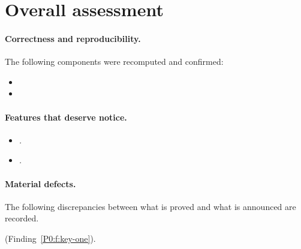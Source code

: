 \documentclass[11pt]{article}
\newcommand{\pk}{P0}
\newif\ifdraftnotes     \draftnotesfalse    %
\theoremstyle{definition}
\newcommand{\fref}[1]{Finding~\ref{\pk:f:#1}}      %
\newcommand{\fpref}[1]{(\fref{#1})}
\newcommand{\note}[1]{\ifdraftnotes\textcolor{red}{\small[\,#1\,]}\fi}
\begin{document}
\section{Overall assessment}

\paragraph{Correctness and reproducibility.}
\note{Verdict in one sentence, then the evidence.} The following components
were recomputed and confirmed:
\begin{itemize}
  \item \note{quantity, with its exact value}
  \item \note{quantity, with its exact value}
\end{itemize}
\note{Say explicitly what kind of check was performed --- exact rational
arithmetic, floating point with a stated tolerance, symbolic re-derivation, or
by hand --- and what a zero residual does and does not establish.}

\paragraph{Features that deserve notice.}
\begin{itemize}
  \item \textit{\note{Label}.} \note{One or two sentences.}
  \item \textit{\note{Label}.} \note{One or two sentences.}
\end{itemize}

\paragraph{Material defects.}
The following discrepancies between what is proved and what is announced are
recorded. \note{State whether any touches a theorem.}

\note{One short paragraph per material finding, each ending with a pointer:}
\fpref{key-one}.
\end{document}
